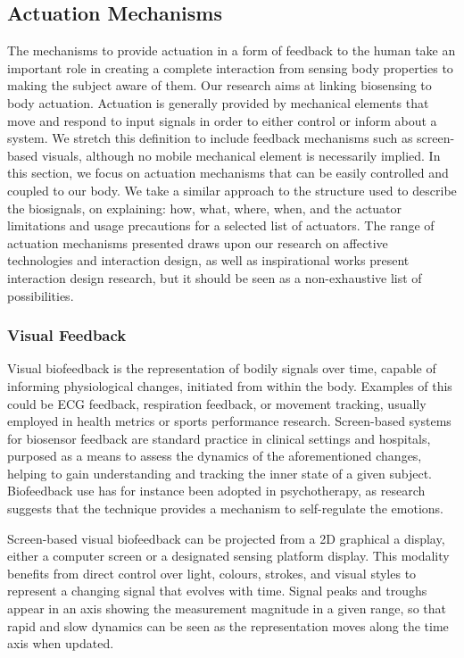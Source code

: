 \subsection{Actuation Mechanisms}

The mechanisms to provide actuation in a form of feedback to the human take an important role in creating a complete interaction from sensing body properties to making the subject aware of them. Our research aims at linking biosensing to body actuation. Actuation is generally provided by mechanical elements that move and respond to input signals in order to either control or inform about a system. We stretch this definition to include feedback mechanisms such as screen-based visuals, although no mobile mechanical element is necessarily implied. In this section, we focus on actuation mechanisms that can be easily controlled and coupled to our body. We take a similar approach to the structure used to describe the biosignals, on explaining: how, what, where, when, and the actuator limitations and usage precautions for a selected list of actuators. The range of actuation mechanisms presented draws upon our research on affective technologies and interaction design, as well as inspirational works present interaction design research, but it should be seen as a non-exhaustive list of possibilities.

\subsubsection{Visual Feedback}

Visual biofeedback is the representation of bodily signals over time, capable of informing physiological changes, initiated from within the body. Examples of this could be ECG feedback, respiration feedback, or movement tracking, usually employed in health metrics or sports performance research. Screen-based systems for biosensor feedback are standard practice in clinical settings and hospitals, purposed as a means to assess the dynamics of the aforementioned changes, helping to gain understanding and tracking the inner state of a given subject. Biofeedback use has for instance been adopted in psychotherapy, as research suggests that the technique provides a mechanism to self-regulate the emotions.

Screen-based visual biofeedback can be projected from a 2D graphical a display, either a computer screen or a designated sensing platform display. This modality benefits from direct control over light, colours, strokes, and visual styles to represent a changing signal that evolves with time. Signal peaks and troughs appear in an axis showing the measurement magnitude in a given range, so that rapid and slow dynamics can be seen as the representation moves along the time axis when updated.

